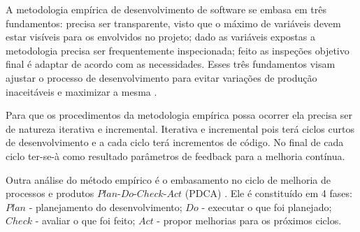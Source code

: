 A metodologia empírica de desenvolvimento de software se embasa em três fundamentos: precisa ser transparente, visto que o máximo de variáveis devem estar visíveis para os envolvidos no projeto; dado as variáveis expostas a metodologia precisa ser frequentemente inspecionada; feito as inspeções objetivo final é adaptar de acordo com as necessidades. Esses três fundamentos visam ajustar o processo de desenvolvimento para evitar variações de produção inaceitáveis e maximizar a mesma \cite{empirical}.

Para que os procedimentos da metodologia empírica possa ocorrer ela precisa ser de natureza iterativa e incremental. Iterativa e incremental pois terá ciclos curtos de desenvolvimento e a cada ciclo terá incrementos de código. No final de cada ciclo ter-se-à como resultado parâmetros de feedback para a melhoria contínua.

Outra análise do método empírico é o embasamento no ciclo de melhoria de processos e produtos $Plan$-$Do$-$Check$-$Act$ (PDCA) \cite{pdca}. Ele é constituído em 4 fases: $Plan$ - planejamento do desenvolvimento; $Do$ - executar o que foi planejado; $Check$ - avaliar o que foi feito; $Act$ - propor melhorias para os próximos ciclos.

